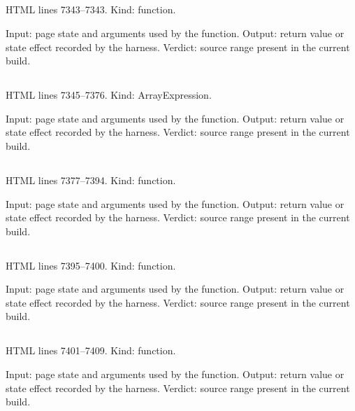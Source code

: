 \subsection*{\texttt{}}
\label{vf_367_mgPan}
HTML lines 7343--7343. Kind: function.

Input: page state and arguments used by the function.
Output: return value or state effect recorded by the harness.
Verdict: source range present in the current build.

\subsection*{\texttt{}}
\label{vf_368_MG_COMMANDS}
HTML lines 7345--7376. Kind: ArrayExpression.

Input: page state and arguments used by the function.
Output: return value or state effect recorded by the harness.
Verdict: source range present in the current build.

\subsection*{\texttt{}}
\label{vf_369_mgCommand}
HTML lines 7377--7394. Kind: function.

Input: page state and arguments used by the function.
Output: return value or state effect recorded by the harness.
Verdict: source range present in the current build.

\subsection*{\texttt{}}
\label{vf_370_mgGo}
HTML lines 7395--7400. Kind: function.

Input: page state and arguments used by the function.
Output: return value or state effect recorded by the harness.
Verdict: source range present in the current build.

\subsection*{\texttt{}}
\label{vf_371_mgGoChart}
HTML lines 7401--7409. Kind: function.

Input: page state and arguments used by the function.
Output: return value or state effect recorded by the harness.
Verdict: source range present in the current build.

